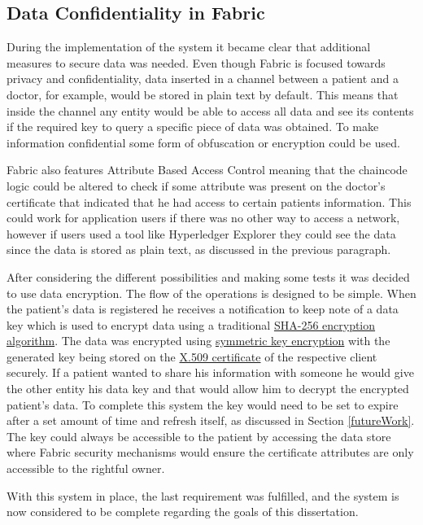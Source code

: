 \subsection{Data Confidentiality in Fabric}

During the implementation of the system it became clear that additional
measures to secure data was needed. Even though Fabric is focused towards
privacy and confidentiality, data inserted in a channel between a patient and a
doctor, for example, would be stored in plain text by default. This means that
inside the channel any entity would be able to access all data and see its
contents if the required key to query a specific piece of data was obtained.
To make information confidential some form of obfuscation or encryption could
be used. 

Fabric also features Attribute Based Access Control meaning that the chaincode
logic could be altered to check if some attribute was present on the doctor's
certificate that indicated that he had access to certain patients information.
This could work for application users if there was no other way to access a
network, however if users used a tool like Hyperledger Explorer they could see
the data since the data is stored as plain text, as discussed in the previous
paragraph.

After considering the different possibilities and making some tests it was
decided to use data encryption. The flow of the operations is designed to be
simple. When the patient's data is registered he receives a notification to
keep note of a data key which is used to encrypt data using a traditional
\href{https://en.wikipedia.org/wiki/SHA-2}{SHA-256 encryption algorithm}. The
data was encrypted using
\href{https://www.ibm.com/support/knowledgecenter/en/SSB23S_1.1.0.14/gtps7/s7symm.html}{symmetric
key encryption} with the generated key being stored on the
\href{https://en.wikipedia.org/wiki/X.509}{X.509 certificate} of the respective
client securely. If a patient wanted to share his information with someone he
would give the other entity his data key and that would allow him to decrypt
the encrypted patient's data. To complete this system the key would need to be
set to expire after a set amount of time and refresh itself, as discussed in
Section \ref{futureWork}. The key could always be accessible to the patient by
accessing the data store where Fabric security mechanisms would ensure the
certificate attributes are only accessible to the rightful owner.

With this system in place, the last requirement was fulfilled, and the system
is now considered to be complete regarding the goals of this dissertation.
